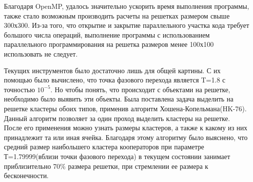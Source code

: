 \documentclass[14pt]{article}
\begin{document}
\par Благодаря OpenMP, удалось значительно ускорить время выполнения программы, также стало возможным производить расчеты на решетках размером свыше 300х300. Из-за того, что открытие и закрытие параллельного участка кода требует большого числа операций, выполнение программы с использованием параллельного программирования на решетка размеров менее 100х100 использовать не следует. 
\par Текущих инструментов было достаточно лишь для общей картины. С их помощью было вычислено, что точка фазового перехода является T=1.8 с точностью $10^{-5}$. Но чтобы понять, что происходит с объектами на решетке, необходимо было выявить эти объекты. Была поставлена задача выделить на решетке кластеры обоих типов, применив алгоритм Хошена-Копельмана(HK-76). Данный алгоритм позволяет за один проход выделить кластеры на решетке. После его применения можно узнать размеры кластеров, а также к какому из них принадлежит та или иная ячейка. Благодаря этому алгоритму было выяснено, что средний размер наибольшего кластера кооператоров при параметре Т=1.79999(вблизи точки фазового перехода) в текущем состоянии занимает приблизительно 70\% размера решетки, при стремлении ее размера к бесконечности. 
\end{document}
